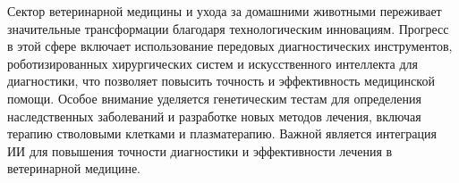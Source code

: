 Сектор ветеринарной медицины и ухода за домашними животными переживает значительные трансформации благодаря технологическим инновациям. Прогресс в этой сфере включает использование передовых диагностических инструментов, роботизированных хирургических систем и искусственного интеллекта для диагностики, что позволяет повысить точность и эффективность медицинской помощи. Особое внимание уделяется генетическим тестам для определения наследственных заболеваний и разработке новых методов лечения, включая терапию стволовыми клетками и плазматерапию. Важной является интеграция ИИ для повышения точности диагностики и эффективности лечения в ветеринарной медицине.
